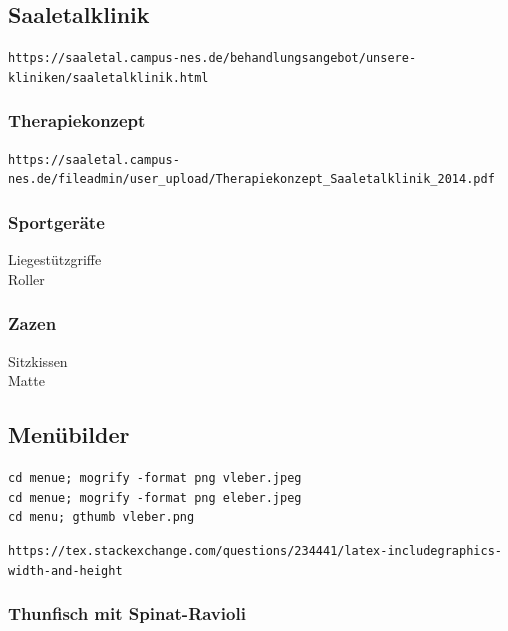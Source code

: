 \documentclass[10pt,a4paper]{article}
\begin{document}
\subsection{Saaletalklinik}

\verb+https://saaletal.campus-nes.de/behandlungsangebot/unsere-kliniken/saaletalklinik.html+


\subsubsection{Therapiekonzept}

\verb+https://saaletal.campus-nes.de/fileadmin/user_upload/Therapiekonzept_Saaletalklinik_2014.pdf+


\subsubsection{Sportgeräte}

Liegestützgriffe \\
Roller 

\subsubsection{Zazen}

Sitzkissen \\
Matte


\subsection{Menübilder}

\verb+cd menue; mogrify -format png vleber.jpeg+ \\
\verb+cd menue; mogrify -format png eleber.jpeg+ \\
\verb+cd menu; gthumb vleber.png+

\vskip 4pt
\verb+https://tex.stackexchange.com/questions/234441/latex-includegraphics-width-and-height+


\subsubsection{Thunfisch mit Spinat-Ravioli}
\end{document}
